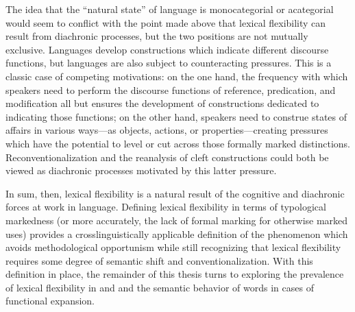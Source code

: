 The idea that the \enquote{natural state} of language is monocategorial or acategorial would seem to conflict with the point made above that lexical flexibility can result from diachronic processes, but the two positions are not mutually exclusive. Languages develop constructions which indicate different discourse functions, but languages are also subject to counteracting pressures. This is a classic case of competing motivations: on the one hand, the frequency with which speakers need to perform the discourse functions of reference, predication, and modification all but ensures the development of constructions dedicated to indicating those functions; on the other hand, speakers need to construe states of affairs in various ways—as objects, actions, or properties—creating pressures which have the potential to level or cut across those formally marked distinctions. Reconventionalization and the reanalysis of cleft constructions could both be viewed as diachronic processes motivated by this latter pressure.

In sum, then, lexical flexibility is a natural result of the cognitive and diachronic forces at work in language. Defining lexical flexibility in terms of typological markedness (or more accurately, the lack of formal marking for otherwise marked uses) provides a crosslinguistically applicable definition of the phenomenon which avoids methodological opportunism while still recognizing that lexical flexibility requires some degree of semantic shift and conventionalization. With this definition in place, the remainder of this thesis turns to exploring the prevalence of lexical flexibility in  and  and the semantic behavior of words in cases of functional expansion.
